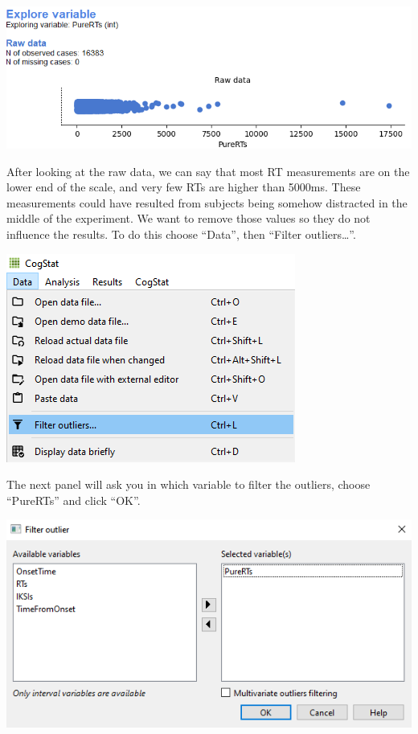 \documentclass[
]{book}
\begin{document}
\includegraphics{img/ch9/9.3expvar_raw.png}

After looking at the raw data, we can say that most RT measurements are on the lower end of the scale, and very few RTs are higher than 5000ms. These measurements could have resulted from subjects being somehow distracted in the middle of the experiment. We want to remove those values so they do not influence the results. To do this choose ``Data'', then ``Filter outliers\ldots{}''.

\includegraphics{img/ch9/9.3filteroutliers_menu.png}

The next panel will ask you in which variable to filter the outliers, choose ``PureRTs'' and click ``OK''.

\includegraphics{img/ch9/9.3filteroutliers_window.png}
\end{document}
